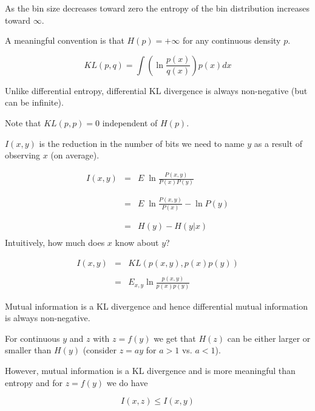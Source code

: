 {\vfill
As the bin size decreases toward zero the entropy of the bin distribution increases toward $\infty$.

\vfill
A meaningful convention is that $H(p) = +\infty$ for any continuous density $p$.


$$KL(p,q) = \int \left( \ln \frac{p(x)}{q(x)}\right) p(x) dx$$

\vfill
Unlike differential entropy, differential KL divergence is always non-negative (but can be infinite).

\vfill
Note that $KL(p,p) = 0$ independent of $H(p)$.


$I(x,y)$ is the reduction in the number of bits we need to name $y$ as a result of observing $x$ (on average).

{\huge
\begin{eqnarray*}
I(x,y) & = & E \;\ln \frac{P(x,y)}{P(x)P(y)} \\
\\
\\
& = & E \;\ln \frac{P(x,y)}{P(x)} - \ln P(y) \\
\\
\\
& = & H(y) - H(y|x) \\
\end{eqnarray*}
}
Intuitively, how much does $x$ know about $y$?



\begin{eqnarray*}
  I(x,y) & = & KL(p(x,y),p(x)p(y)) \\
  \\
  & = & E_{x,y} \ln \frac{p(x,y)}{p(x)p(y)}
\end{eqnarray*}

\vfill
Mutual information is a KL divergence and hence differential mutual information is always non-negative.


For continuous $y$ and $z$ with $z = f(y)$ we get that $H(z)$ can be either larger or smaller than $H(y)$ (consider $z = ay$ for $a >1$ vs. $a<1$).

\vfill
However, mutual information is a KL divergence and is more meaningful than entropy and for $z = f(y)$ we do have

$$I(x,z) \leq I(x,y)$$

}
